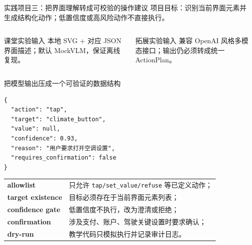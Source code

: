 \begin{frame}{实践项目三：把界面理解转成可校验的操作建议}
  \small 项目目标：识别当前界面元素并生成结构化动作；低置信度或高风险动作不直接执行。
  \vspace{0.25em}
  \begin{center}
  \end{center}
  \vspace{0.4em}
  \begin{columns}[T,onlytextwidth]
      \begin{block}{课堂实验输入}
        本地 SVG + 对应 JSON 界面描述；默认 MockVLM，保证离线复现。
      \end{block}
      \begin{block}{拓展实验输入}
        兼容 OpenAI 风格多模态接口；输出仍必须转成统一 ActionPlan。
      \end{block}
  \end{columns}
\end{frame}

\begin{frame}[fragile]{把模型输出压成一个可验证的数据结构}
\begin{lstlisting}
{
  "action": "tap",
  "target": "climate_button",
  "value": null,
  "confidence": 0.93,
  "reason": "用户要求打开空调设置",
  "requires_confirmation": false
}
\end{lstlisting}
  \vspace{0.15em}
  \small
  \begin{tabularx}{\textwidth}{>{\bfseries}p{2.5cm} X}
    allowlist & 只允许 \texttt{tap/set\_value/refuse} 等已定义动作；\\
    target existence & 目标必须存在于当前界面元素列表；\\
    confidence gate & 低置信度不执行，改为澄清或拒绝；\\
    confirmation & 涉及支付、账户、驾驶关键设置时要求确认；\\
    dry-run & 教学代码只模拟执行并记录审计日志。\\
  \end{tabularx}
\end{frame}

